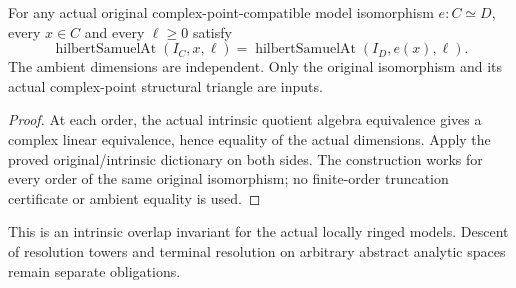 \begin{theorem}
\label{hir:actual-analytic-subspace-intrinsic-hs-invariance}
\leanok
For any actual original complex-point-compatible model isomorphism
$e:C\simeq D$, every $x\in C$ and every $\ell\ge0$ satisfy
\[
 \operatorname{hilbertSamuelAt}(I_C,x,\ell)
 =\operatorname{hilbertSamuelAt}(I_D,e(x),\ell).
\]
The ambient dimensions are independent. Only the original isomorphism and
its actual complex-point structural triangle are inputs.
\end{theorem}
\begin{proof}
At each order, the actual intrinsic quotient algebra equivalence gives a
complex linear equivalence, hence equality of the actual dimensions. Apply
the proved original/intrinsic dictionary on both sides. The construction
works for every order of the same original isomorphism; no finite-order
truncation certificate or ambient equality is used.
\end{proof}

This is an intrinsic overlap invariant for the actual locally ringed models.
Descent of resolution towers and terminal resolution on arbitrary abstract
analytic spaces remain separate obligations.
